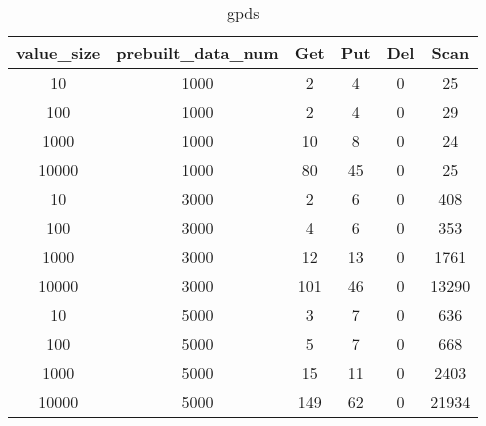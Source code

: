 \begin{table}[H]
\centering
\begin{tabular}{|c|c|c|c|c|c|}
\hline
value_size & prebuilt_data_num & Get & Put & Del & Scan \\
\hline
10 & 1000 & 2 & 4 & 0 & 25 \\
100 & 1000 & 2 & 4 & 0 & 29 \\
1000 & 1000 & 10 & 8 & 0 & 24 \\
10000 & 1000 & 80 & 45 & 0 & 25 \\
10 & 3000 & 2 & 6 & 0 & 408 \\
100 & 3000 & 4 & 6 & 0 & 353 \\
1000 & 3000 & 12 & 13 & 0 & 1761 \\
10000 & 3000 & 101 & 46 & 0 & 13290 \\
10 & 5000 & 3 & 7 & 0 & 636 \\
100 & 5000 & 5 & 7 & 0 & 668 \\
1000 & 5000 & 15 & 11 & 0 & 2403 \\
10000 & 5000 & 149 & 62 & 0 & 21934 \\
\hline
\end{tabular}
\caption{gpds}
\end{table}
